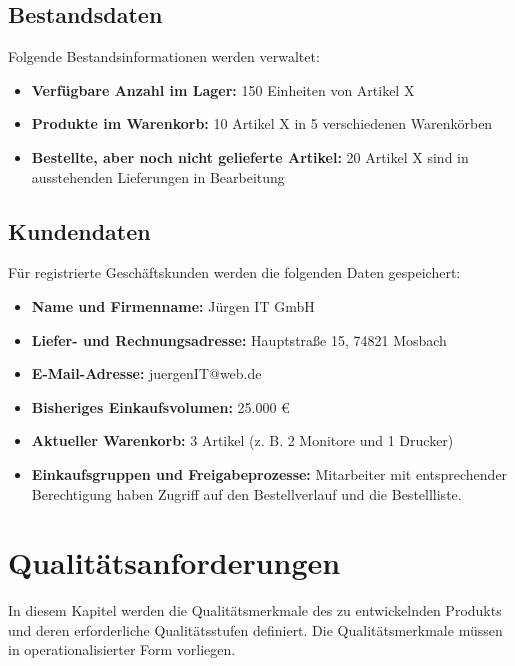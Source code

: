 \documentclass[%
	12pt,
	a4paper,
	oneside,
	parskip=full
]{scrbook}
\begin{document}
\section{Bestandsdaten}
Folgende Bestandsinformationen werden verwaltet:

\begin{itemize}
	\item \textbf{Verfügbare Anzahl im Lager:} 150 Einheiten von Artikel X
	\item \textbf{Produkte im Warenkorb:} 10 Artikel X in 5 verschiedenen Warenkörben
	\item \textbf{Bestellte, aber noch nicht gelieferte Artikel:} 20 Artikel X sind in ausstehenden Lieferungen in Bearbeitung
\end{itemize}

\section{Kundendaten}
Für registrierte Geschäftskunden werden die folgenden Daten gespeichert:

\begin{itemize}
	\item \textbf{Name und Firmenname:} Jürgen IT GmbH
	\item \textbf{Liefer- und Rechnungsadresse:} Hauptstraße 15, 74821 Mosbach
	\item \textbf{E-Mail-Adresse:} juergenIT@web.de
	\item \textbf{Bisheriges Einkaufsvolumen:} 25.000 €
	\item \textbf{Aktueller Warenkorb:} 3 Artikel (z. B. 2 Monitore und 1 Drucker)
	\item \textbf{Einkaufsgruppen und Freigabeprozesse:}  
	Mitarbeiter mit entsprechender Berechtigung haben Zugriff auf den Bestellverlauf und die Bestellliste.
\end{itemize}

\chapter{Qualitätsanforderungen}
In diesem Kapitel werden die Qualitätsmerkmale des zu entwickelnden Produkts und deren erforderliche Qualitätsstufen definiert. Die Qualitätsmerkmale müssen in operationalisierter Form vorliegen.
\end{document}
